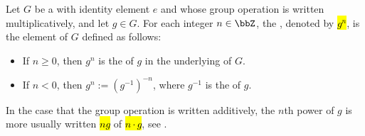 \begin{definition} \label{definition:power_of_a_group_element_by_an_integer}
Let $G$ be a  with identity element $e$ and whose group operation is written multiplicatively, and let $g \in G$. For each integer $n \in \bbZ$, the , denoted by \hl{$g^n$}, is the element of $G$ defined as follows:
\begin{itemize}
    \item If $n \geq 0$, then $g^n$ is the  of $g$ in the underlying  of $G$.
    \item If $n < 0$, then $g^n := (g^{-1})^{-n}$, where $g^{-1}$ is the  of $g$.
\end{itemize}
In the case that the group operation is written additively, the $n$th power of $g$ is more usually written \hl{$ng$} of \hl{$n \cdot g$}, see .
\end{definition}
